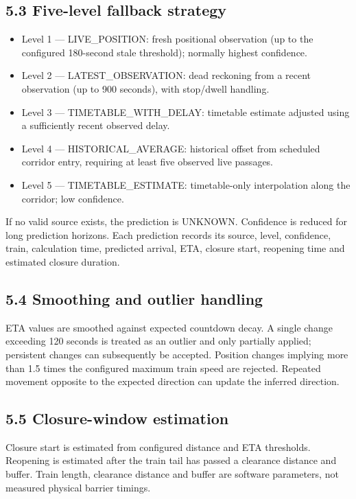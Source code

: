 \documentclass[12pt,a4paper]{report}
\begin{document}
\subsection{5.3 Five-level fallback strategy}
\begin{itemize}\item Level 1 --- LIVE\_POSITION: fresh positional observation (up to the configured 180-second stale threshold); normally highest confidence.\end{itemize}
\begin{itemize}\item Level 2 --- LATEST\_OBSERVATION: dead reckoning from a recent observation (up to 900 seconds), with stop/dwell handling.\end{itemize}
\begin{itemize}\item Level 3 --- TIMETABLE\_WITH\_DELAY: timetable estimate adjusted using a sufficiently recent observed delay.\end{itemize}
\begin{itemize}\item Level 4 --- HISTORICAL\_AVERAGE: historical offset from scheduled corridor entry, requiring at least five observed live passages.\end{itemize}
\begin{itemize}\item Level 5 --- TIMETABLE\_ESTIMATE: timetable-only interpolation along the corridor; low confidence.\end{itemize}
If no valid source exists, the prediction is UNKNOWN. Confidence is reduced for long prediction horizons. Each prediction records its source, level, confidence, train, calculation time, predicted arrival, ETA, closure start, reopening time and estimated closure duration.

\subsection{5.4 Smoothing and outlier handling}
ETA values are smoothed against expected countdown decay. A single change exceeding 120 seconds is treated as an outlier and only partially applied; persistent changes can subsequently be accepted. Position changes implying more than 1.5 times the configured maximum train speed are rejected. Repeated movement opposite to the expected direction can update the inferred direction.

\subsection{5.5 Closure-window estimation}
Closure start is estimated from configured distance and ETA thresholds. Reopening is estimated after the train tail has passed a clearance distance and buffer. Train length, clearance distance and buffer are software parameters, not measured physical barrier timings.
\end{document}
